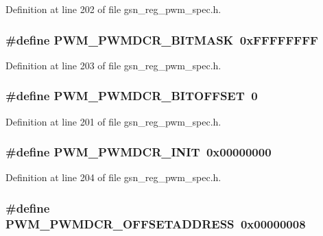 Definition at line 202 of file gsn\_\-reg\_\-pwm\_\-spec.h.

\hypertarget{a00565_a0826361be1f002b278f3ac4cae30f3f4}{
\subsubsection[{PWM\_\-PWMDCR\_\-BITMASK}]{\setlength{\rightskip}{0pt plus 5cm}\#define PWM\_\-PWMDCR\_\-BITMASK~0xFFFFFFFF}}
\label{a00565_a0826361be1f002b278f3ac4cae30f3f4}


Definition at line 203 of file gsn\_\-reg\_\-pwm\_\-spec.h.

\hypertarget{a00565_aac0b51e2bb02790b399b2c96855f6e5d}{
\subsubsection[{PWM\_\-PWMDCR\_\-BITOFFSET}]{\setlength{\rightskip}{0pt plus 5cm}\#define PWM\_\-PWMDCR\_\-BITOFFSET~0}}
\label{a00565_aac0b51e2bb02790b399b2c96855f6e5d}


Definition at line 201 of file gsn\_\-reg\_\-pwm\_\-spec.h.

\hypertarget{a00565_a535f439651c1fb9edae479c50cf4e2b9}{
\subsubsection[{PWM\_\-PWMDCR\_\-INIT}]{\setlength{\rightskip}{0pt plus 5cm}\#define PWM\_\-PWMDCR\_\-INIT~0x00000000}}
\label{a00565_a535f439651c1fb9edae479c50cf4e2b9}


Definition at line 204 of file gsn\_\-reg\_\-pwm\_\-spec.h.

\hypertarget{a00565_aa1693c2827f9d8708ca5db029964edde}{
\subsubsection[{PWM\_\-PWMDCR\_\-OFFSETADDRESS}]{\setlength{\rightskip}{0pt plus 5cm}\#define PWM\_\-PWMDCR\_\-OFFSETADDRESS~0x00000008}}
\label{a00565_aa1693c2827f9d8708ca5db029964edde}


